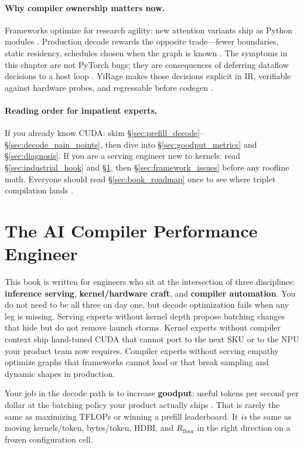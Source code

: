 \paragraph{Why compiler ownership matters now.}
Frameworks optimize for research agility: new attention variants ship as Python modules \citep{dao2022flashattention}.
Production decode rewards the opposite trade---fewer boundaries, static residency, schedules chosen when the graph is known \citep{chen2020compilerbasedhardw,yirage2026}.
The symptoms in this chapter are not PyTorch bugs; they are consequences of deferring dataflow decisions to a host loop \citep{taxbreak2026,memoryfloor2026}.
YiRage makes those decisions explicit in IR, verifiable against hardware probes, and regressable before codegen \citep{yirage2026}.

\paragraph{Reading order for impatient experts.}
If you already know CUDA: skim \S\ref{sec:prefill_decode}--\S\ref{sec:decode_pain_points}, then dive into \S\ref{sec:goodput_metrics} and \S\ref{sec:diagnosis}.
If you are a serving engineer new to kernels: read \S\ref{sec:industrial_hook} and \S\ref{sec:role}, then \S\ref{sec:framework_issues} before any roofline math.
Everyone should read \S\ref{sec:book_roadmap} once to see where triplet compilation lands \citep{yirage2026}.




\section{The AI Compiler Performance Engineer}
\label{sec:role}

This book is written for engineers who sit at the intersection of three disciplines: \textbf{inference serving}, \textbf{kernel/hardware craft}, and \textbf{compiler automation}.
You do not need to be all three on day one, but decode optimization fails when any leg is missing.
Serving experts without kernel depth propose batching changes that hide but do not remove launch storms.
Kernel experts without compiler context ship hand-tuned CUDA that cannot port to the next SKU or to the NPU your product team now requires.
Compiler experts without serving empathy optimize graphs that frameworks cannot load or that break sampling and dynamic shapes in production.

Your job in the decode path is to increase \textbf{goodput}: useful tokens per second per dollar at the batching policy your product actually ships \citep{patel2025llminference,fan2025ellieenergyefficie}.
That is rarely the same as maximizing TFLOPs or winning a prefill leaderboard.
It \emph{is} the same as moving kernels/token, bytes/token, HDBI, and $R_{\mathrm{floor}}$ in the right direction on a frozen configuration cell.

